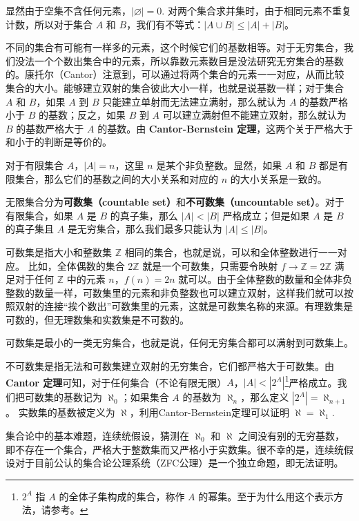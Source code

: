

显然由于空集不含任何元素，$|\varnothing|=0$. 对两个集合求并集时，由于相同元素不重复计数，所以对于集合 $A$ 和 $B$，我们有不等式：$|A\cup B|\leqslant|A|+|B|$。

不同的集合有可能有一样多的元素，这个时候它们的基数相等。对于无穷集合，我们没法一个个数出集合中的元素，所以靠数元素数目是没法研究无穷集合的基数的。康托尔（Cantor）注意到，可以通过将两个集合的元素一一对应，从而比较集合的大小。能够建立双射的集合彼此大小一样，也就是说基数一样；对于集合 $A$ 和 $B$，如果 $A$ 到 $B$ 只能建立单射而无法建立满射，那么就认为 $A$ 的基数严格小于 $B$ 的基数；反之，如果 $B$ 到 $A$ 可以建立满射但不能建立双射，那么就认为 $B$ 的基数严格大于 $A$ 的基数。由 \textbf{Cantor-Bernstein 定理}，这两个关于严格大于和小于的判断是等价的。

对于有限集合 $A$，$|A|=n$，这里 $n$ 是某个非负整数。显然，如果 $A$ 和 $B$ 都是有限集合，那么它们的基数之间的大小关系和对应的 $n$ 的大小关系是一致的。

无限集合分为\textbf{可数集（countable set）}和\textbf{不可数集（uncountable set）}。对于有限集合，如果 $A$ 是 $B$ 的真子集，那么 $|A|<|B|$ 严格成立；但是如果 $A$ 是 $B$ 的真子集且 $A$ 是无穷集合，那么我们最多只能认为 $|A|\leqslant|B|$。

可数集是指大小和整数集 $\mathbb{Z}$ 相同的集合，也就是说，可以和全体整数进行一一对应。 比如，全体偶数的集合 $2\mathbb{Z}$ 就是一个可数集，只需要令映射 $f\rightarrow \mathbb{Z}=2\mathbb{Z}$ 满足对于任何 $\mathbb{Z}$ 中的元素 $n$，$f(n)=2n$ 就可以。由于全体整数的数量和全体非负整数的数量一样，可数集里的元素和非负整数也可以建立双射，这样我们就可以按照双射的连接“挨个数出”可数集里的元素，这就是可数集名称的来源。有理数集是可数的，但无理数集和实数集是不可数的。

可数集是最小的一类无穷集合，也就是说，任何无穷集合都可以满射到可数集上。

不可数集是指无法和可数集建立双射的无穷集合，它们都严格大于可数集。由 \textbf{Cantor 定理}可知，对于任何集合（不论有限无限）$A$，$|A|<|2^A|$\footnote{$2^A$ 指 $A$ 的全体子集构成的集合，称作 $A$ 的幂集。至于为什么用这个表示方法，请参考。}严格成立。我们把可数集的基数记为 $\aleph_0$；如果集合 $A$ 的基数为 $\aleph_n$，那么定义 $|2^A|=\aleph_{n+1}$。 实数集的基数被定义为 $\aleph$，利用Cantor-Bernstein定理可以证明 $\aleph=\aleph_1$. 

集合论中的基本难题，连续统假设，猜测在 $\aleph_0$ 和 $\aleph$ 之间没有别的无穷基数，即不存在一个集合，严格大于整数集而又严格小于实数集。很不幸的是，连续统假设对于目前公认的集合论公理系统（ZFC公理）是一个独立命题，即无法证明。

